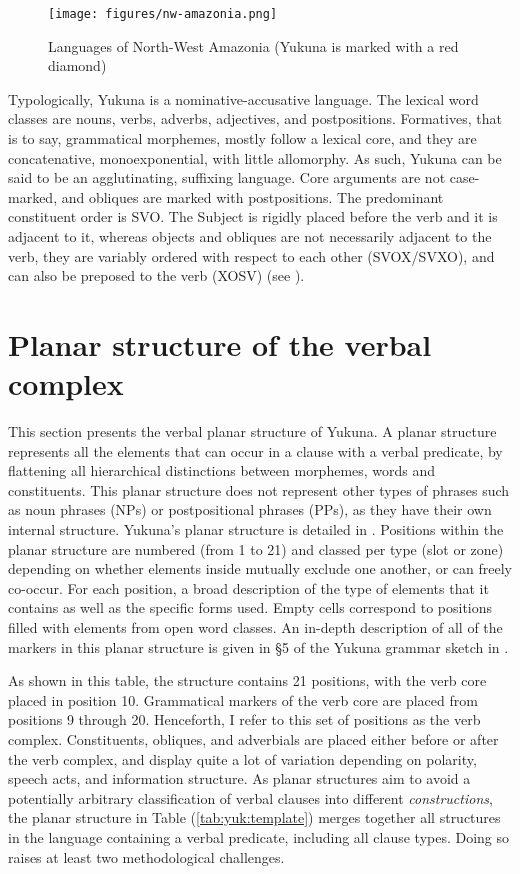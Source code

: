 \documentclass[output=paper]{langscibook}
\begin{document}
\begin{figure}
\centering
\texttt{[image: figures/nw-amazonia.png]}
\caption{Languages of North-West Amazonia (Yukuna is marked with a red diamond) \citep{hammarstrom_glottolog_2019}}
\label{fig:1}
\end{figure}

Typologically, Yukuna is a nominative-accusative language. The lexical word classes are nouns, verbs, adverbs, adjectives, and postpositions. Formatives, that is to say, grammatical morphemes, mostly follow a lexical core, and they are concatenative, monoexponential, with little allomorphy. As such, Yukuna can be said to be an agglutinating, suffixing language. Core arguments are not case-marked, and obliques are marked with postpositions. The predominant constituent order is SVO. The Subject is rigidly placed before the verb and it is adjacent to it, whereas objects and obliques are not necessarily adjacent to the verb, they are variably ordered with respect to each other (SVOX/SVXO), and can also be preposed to the verb (XOSV) (see \citealt[97--102]{lemus2020}).

\section{Planar structure of the verbal complex} %
\label{sec:yuk:planarstructures'}

This section presents the verbal planar structure of Yukuna. A planar structure represents all the elements that can occur in a clause with a verbal predicate, by flattening all hierarchical distinctions between morphemes, words and constituents. This planar structure does not represent other types of phrases such as noun phrases (NPs) or postpositional phrases (PPs), as they have their own internal structure.
Yukuna's planar structure is detailed in . Positions within the planar structure are numbered (from 1 to 21) and classed per type (slot or zone) depending on whether elements inside mutually exclude one another, or can freely co-occur. For each position, a broad description of the type of elements that it contains as well as the specific forms used. Empty cells correspond to positions filled with elements from open word classes. An in-depth description of all of the markers in this planar structure is given in §5 of the Yukuna grammar sketch in \citet{lemus2020}.

As shown in this table, the structure contains 21 positions, with the verb core placed in position 10. Grammatical markers of the verb core are placed from positions 9 through 20. Henceforth, I refer to this set of positions as the verb complex. Constituents, obliques, and adverbials are placed either before or after the verb complex, and display quite a lot of variation depending on polarity, speech acts, and information structure. 
As planar structures aim to avoid a potentially arbitrary classification of verbal clauses into different \textit{constructions}, the planar structure in Table (\ref{tab:yuk:template}) merges together all structures in the language containing a verbal predicate, including all clause types. Doing so raises at least two methodological challenges. 
\end{document}
